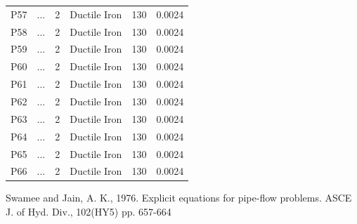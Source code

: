 \documentclass[12pt]{article}
\begin{document}
\begin{enumerate}
\begin{table}[h!]
\begin{tabular}{p{1in}p{1in}p{1in}p{1in}p{1in}p{1in}}
P57 & $\dots$ & 2 &Ductile Iron & 130 & 0.0024  \\
P58 & $\dots$ & 2 &Ductile Iron & 130 & 0.0024  \\
P59 & $\dots$ & 2 &Ductile Iron & 130 & 0.0024  \\
P60 & $\dots$ & 2 &Ductile Iron & 130 & 0.0024  \\
P61 & $\dots$ & 2 &Ductile Iron & 130 & 0.0024  \\
P62 & $\dots$ & 2 &Ductile Iron & 130 & 0.0024  \\
P63 & $\dots$ & 2 &Ductile Iron & 130 & 0.0024  \\
P64 & $\dots$ & 2 &Ductile Iron & 130 & 0.0024  \\
P65 & $\dots$ & 2 &Ductile Iron & 130 & 0.0024  \\
P66 & $\dots$ & 2 &Ductile Iron & 130 & 0.0024  \\
\hline
   \end{tabular}

   \label{tab:ByPipes}
\end{table}

\end{enumerate}
\clearpage
\begin{thebibliography}{}

Swamee and Jain, A. K., 1976. Explicit equations for pipe-flow problems.  ASCE J. of Hyd. Div., 102(HY5) pp. 657-664 


\end{thebibliography}
\end{document}
